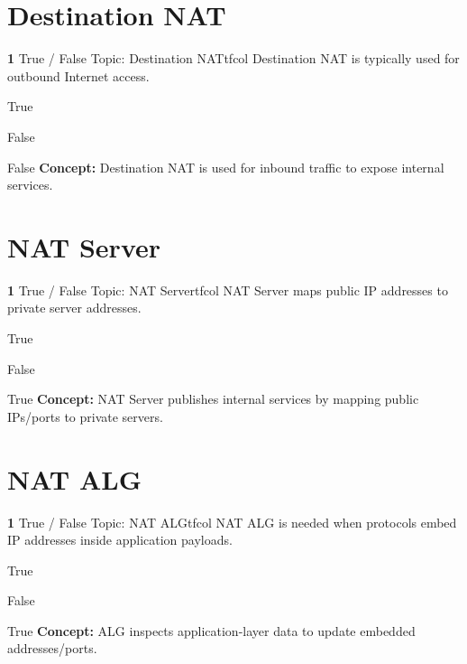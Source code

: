 \documentclass[10pt,a4paper]{article}
\begin{document}
\section{Destination NAT}
\begin{qcard}{\color{white}\textbf{1} \hfill \small True / False \textbar{} Topic: Destination NAT}{tfcol}
Destination NAT is typically used for outbound Internet access.

\begin{qoptions}
\item True
\item False
\end{qoptions}
\begin{explainbox}{False}
\textbf{Concept:} Destination NAT is used for inbound traffic to expose internal services.
\end{explainbox}
\end{qcard}

\section{NAT Server}
\begin{qcard}{\color{white}\textbf{1} \hfill \small True / False \textbar{} Topic: NAT Server}{tfcol}
NAT Server maps public IP addresses to private server addresses.

\begin{qoptions}
\item True
\item False
\end{qoptions}
\begin{explainbox}{True}
\textbf{Concept:} NAT Server publishes internal services by mapping public IPs/ports to private servers.
\end{explainbox}
\end{qcard}

\section{NAT ALG}
\begin{qcard}{\color{white}\textbf{1} \hfill \small True / False \textbar{} Topic: NAT ALG}{tfcol}
NAT ALG is needed when protocols embed IP addresses inside application payloads.

\begin{qoptions}
\item True
\item False
\end{qoptions}
\begin{explainbox}{True}
\textbf{Concept:} ALG inspects application-layer data to update embedded addresses/ports.
\end{explainbox}
\end{qcard}
\end{document}
